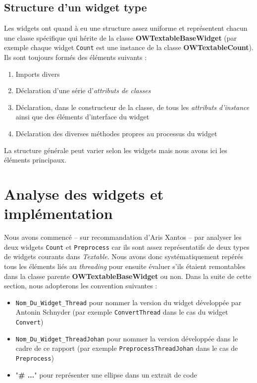 \documentclass{article}
\begin{document}
\subsection{Structure d'un widget type}

Les widgets ont quand à eu une structure assez uniforme et représentent chacun une classe spécifique qui hérite de la classe \textbf{OWTextableBaseWidget} (par exemple chaque widget \texttt{Count} est une instance de la classe \textbf{OWTextableCount}). Ils sont toujours formés des éléments suivants : 

\begin{enumerate}
    \item Imports divers
    \item Déclaration d'une série d'\textit{attributs de classes}
    \item Déclaration, dans le constructeur de la classe, de tous les \textit{attributs d'instance} ainsi que des éléments d'interface du widget
    \item Déclaration des diverses méthodes propres au processus du widget
\end{enumerate}

La structure générale peut varier selon les widgets mais nous avons ici les éléments principaux.

\section{Analyse des widgets et implémentation}

Nous avons commencé – sur recommandation d'Aris Xantos – par analyser les deux widgets \texttt{Count} et \texttt{Preprocess} car ils sont assez représentatifs de deux types de widgets courants dans \textit{Textable}. Nous avons donc systématiquement repérés tous les éléments liés au \textit{threading} pour ensuite évaluer s'ils étaient remontables dans la classe parente \textbf{OWTextableBaseWidget} ou non. Dans la suite de cette section, nous adopterons les convention suivantes : 

\begin{itemize}
    \item \texttt{Nom\_Du\_Widget\_Thread} pour nommer la version du widget développée par Antonin Schnyder (par exemple \texttt{ConvertThread} dans le cas du widget \texttt{Convert})
    \item \texttt{Nom\_Du\_Widget\_ThreadJohan} pour nommer la version développée dans le cadre de ce rapport (par exemple \texttt{PreprocessThreadJohan} dans le cas de \texttt{Preprocess})
    \item "\textbf{\# ...}" pour représenter une ellipse dans un extrait de code
\end{itemize}
\end{document}
